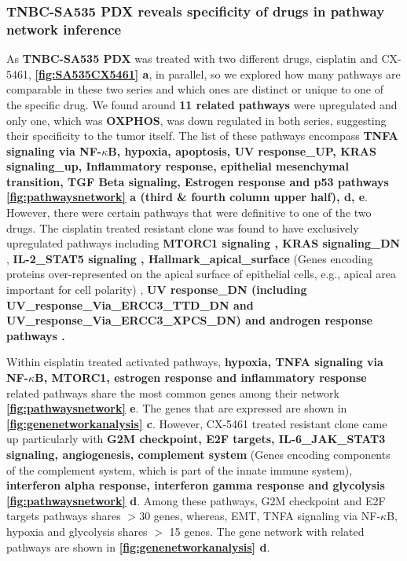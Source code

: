 
\subsubsection{TNBC-SA535 PDX reveals specificity of drugs in pathway network inference} 
As \textbf{TNBC-SA535 PDX} was treated with two different drugs, cisplatin and CX-5461, \textbf{\autoref{fig:SA535CX5461} a}, in parallel, so we explored how many pathways are comparable in these two series and which ones are distinct or unique to one of the specific drug. 
We found around \textbf{11 related pathways} were upregulated and only one, which was \textbf{\ac{OXPHOS}}, was down regulated in both series, suggesting their specificity to the tumor itself. The list of these pathways encompass \textbf{TNFA signaling via NF-$\kappa$B, hypoxia, apoptosis, UV response\_UP, KRAS signaling\_up, Inflammatory response, epithelial mesenchymal transition, TGF Beta signaling, Estrogen response and p53 pathways} {\textbf{\autoref{fig:pathwaysnetwork} a (third \& fourth column upper half), d, e}.} However, there were certain pathways that were definitive to one of the two drugs. The cisplatin treated resistant clone was found to have exclusively upregulated pathways including \textbf{MTORC1 signaling \cite{peng2010role}, KRAS signaling\_DN} \cite{tao2014oncogenic}, \textbf{IL-2\_STAT5 signaling \cite{wu2020activation, gutierrez2020role}, Hallmark\_apical\_surface} (Genes encoding proteins over-represented on the apical surface of epithelial cells, e.g., apical area important for cell polarity) \cite{halaoui2015rewiring, wodarz2007cell}, \textbf{UV response\_DN (including UV\_response\_Via\_ERCC3\_TTD\_DN
and UV\_response\_Via\_ERCC3\_XPCS\_DN) and androgen response pathways \cite{rampurwala2016role, michmerhuizen2020we}.}

Within cisplatin treated activated pathways, \textbf{hypoxia, TNFA signaling via NF-$\kappa$B, MTORC1, estrogen response and inflammatory response} related pathways share the most common genes among their network \textbf{\autoref{fig:pathwaysnetwork} e}. The genes that are expressed are shown in  \textbf{\autoref{fig:genenetworkanalysis} c}. However, CX-5461 treated resistant clone came up particularly with \textbf{G2M checkpoint, E2F targets, IL-6\_JAK\_STAT3 signaling, angiogenesis, complement system} (Genes encoding components of the complement system, which is part of the innate immune system), \textbf{ interferon alpha response, interferon gamma response and glycolysis} \textbf{\autoref{fig:pathwaysnetwork} d}. Among these pathways, G2M checkpoint and E2F targets pathways shares $>$30 genes, whereas, \ac{EMT}, TNFA signaling via NF-$\kappa$B, hypoxia and glycolysis shares $>$ 15 genes. The gene network with related pathways are shown in  \textbf{\autoref{fig:genenetworkanalysis} d}. 

